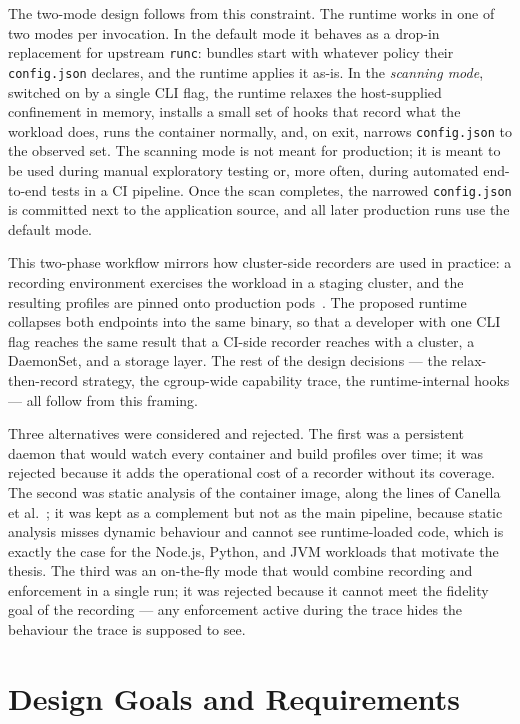 The two-mode design follows from this constraint. The runtime works in one of two modes per invocation. In the default mode it behaves as a drop-in replacement for upstream \texttt{runc}: bundles start with whatever policy their \texttt{config.json} declares, and the runtime applies it as-is. In the \emph{scanning mode}, switched on by a single CLI flag, the runtime relaxes the host-supplied confinement in memory, installs a small set of hooks that record what the workload does, runs the container normally, and, on exit, narrows \texttt{config.json} to the observed set. The scanning mode is not meant for production; it is meant to be used during manual exploratory testing or, more often, during automated end-to-end tests in a CI pipeline. Once the scan completes, the narrowed \texttt{config.json} is committed next to the application source, and all later production runs use the default mode.

This two-phase workflow mirrors how cluster-side recorders are used in practice: a recording environment exercises the workload in a staging cluster, and the resulting profiles are pinned onto production pods~\cite{spo2025}. The proposed runtime collapses both endpoints into the same binary, so that a developer with one CLI flag reaches the same result that a CI-side recorder reaches with a cluster, a DaemonSet, and a storage layer. The rest of the design decisions --- the relax-then-record strategy, the cgroup-wide capability trace, the runtime-internal hooks --- all follow from this framing.

Three alternatives were considered and rejected. The first was a persistent daemon that would watch every container and build profiles over time; it was rejected because it adds the operational cost of a recorder without its coverage. The second was static analysis of the container image, along the lines of Canella et al.~\cite{canella2021}; it was kept as a complement but not as the main pipeline, because static analysis misses dynamic behaviour and cannot see runtime-loaded code, which is exactly the case for the Node.js, Python, and JVM workloads that motivate the thesis. The third was an on-the-fly mode that would combine recording and enforcement in a single run; it was rejected because it cannot meet the fidelity goal of the recording --- any enforcement active during the trace hides the behaviour the trace is supposed to see.

\section{Design Goals and Requirements}\label{sec:design-goals}


